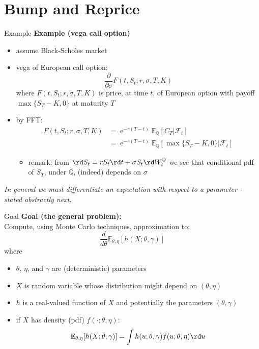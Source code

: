 \documentclass[pdf, handout]{beamer}
\newcommand{\e}{\operatorname{e}}
\begin{document}
\section{Bump and Reprice}

\begin{frame}{Example}
\textbf{Example (vega call option)}
\begin{itemize}
\item assume Black-Scholes market
\item vega of European call option: 
\[
\frac{\partial}{\partial\sigma} F(t,S_t;r,\sigma,T,K)
\]
where $F(t,S_t;r,\sigma,T,K)$ is price, at time $t$, of European option with payoff $\max\{S_T-K,0\}$ at maturity $T$ 
\item by FFT:
\begin{align*}
F(t,S_t;r,\sigma,T,K) 
&=  \e^{-r(T-t)}  
\mathbb{E}_{\mathbb{Q}}\left[ C_T        | \mathcal{F}_t   \right]
\\
&=  \e^{-r(T-t)}  
\mathbb{E}_{\mathbb{Q}}\left[\max\{S_T-K,0\}        | \mathcal{F}_t    \right]
\end{align*}
\begin{itemize}
\item remark: from $\rd S_t = r S_t \rd t + \sigma S_t \rd W_t^{\mathbb{Q}}$
we see that conditional pdf of $S_T$, under $\mathbb{Q}$, (indeed) depends on $\sigma$
\end{itemize}
\end{itemize}
\medskip
\emph{In general we must differentiate an expectation with respect to a parameter - stated abstractly next.}
\end{frame}

\begin{frame}{Goal}
\textbf{Goal (the general problem):} \\
Compute, using Monte Carlo techniques, approximation to:
$$
\frac{d}{d\theta} \mathbb{E}_{\theta,\eta} [ h(X; \theta, \gamma)]
$$
where
\begin{itemize}
\item $\theta$, $\eta$, and $\gamma$ are (deterministic) parameters
\item  $X$ is random variable whose distribution might depend on $(\theta,\eta)$
\item  $h$ is a real-valued function of $X$ and potentially the parameters
$(\theta,\gamma)$
\item if $X$ has density (pdf) $f(\cdot;\theta,\eta)$:
\[
 \mathbb{E}_{\theta,\eta} [ h(X; \theta, \gamma)]
 = \int  h(u; \theta, \gamma)  f(u;\theta,\eta) \rd u
\]
\end{itemize}
\end{frame}
\end{document}
